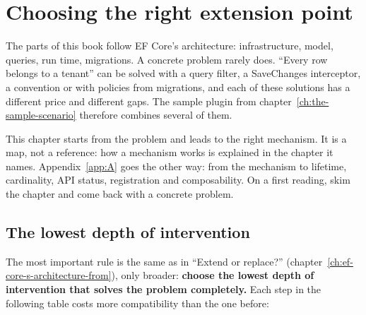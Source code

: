 \chapter{Choosing the right extension point}\label{ch:choosing-the-right-extension-point}

The parts of this book follow EF Core's architecture: infrastructure, model, queries, run
time, migrations. A concrete problem rarely does. “Every row belongs to a tenant” can be
solved with a query filter, a SaveChanges interceptor, a convention or with policies from
migrations, and each of these solutions has a different price and different gaps. The
sample plugin from chapter~\ref{ch:the-sample-scenario} therefore combines several of them.

This chapter starts from the problem and leads to the right mechanism. It is a map, not a
reference: how a mechanism works is explained in the chapter it names. Appendix~\ref{app:A}
goes the other way: from the mechanism to lifetime, cardinality, API status, registration and
composability. On a first reading, skim the
chapter and come back with a concrete problem.

\section{The lowest depth of intervention}

The most important rule is the same as in “Extend or replace?”
(chapter~\ref{ch:ef-core-s-architecture-from}), only broader: \textbf{choose the lowest
depth of intervention that solves the problem completely.} Each step in the following table
costs more compatibility than the one before:

